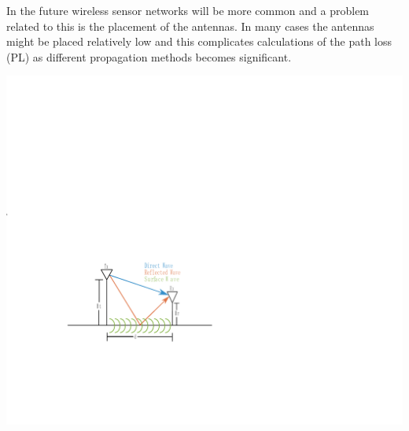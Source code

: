 \large


In the future wireless sensor networks will be more common and a problem related to this is the placement of the antennas. In many cases the antennas might be placed relatively low and this complicates calculations of the path loss (PL) as different propagation methods becomes significant. 

\begin{center}
\includegraphics[scale=1.2]{pix/poster_cropped_1.pdf}
\end{center}
